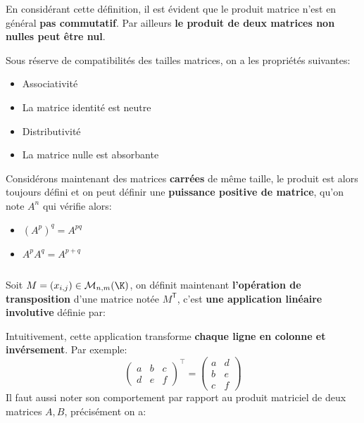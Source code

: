 En considérant cette définition, il est évident que le produit matrice n'est en général \textbf{pas commutatif}. Par ailleurs \textbf{le produit de deux matrices non nulles peut être nul}.
\pagebreak

Sous réserve de compatibilités des tailles matrices, on a les propriétés suivantes:
\begin{multicols}{2}
   \begin{itemize}
      \item Associativité
      \item La matrice identité est neutre
      \item Distributivité
      \item La matrice nulle est absorbante
   \end{itemize}
\end{multicols}   

Considérons maintenant des matrices \textbf{carrées} de même taille, le produit est alors toujours défini et on peut définir une \textbf{puissance positive de matrice}, qu'on note \(A^n\) qui vérifie alors:

\begin{multicols}{2}
   \begin{itemize}
      \item \((A^p)^q = A^{pq}\)
      \item \(A^pA^q = A^{p +q}\)
   \end{itemize}
\end{multicols}    

\subsection*{}

Soit \(M = (x_{i,j})\in \mathcal{M}_{n, m}(\K)\), on définit maintenant \textbf{l'opération de transposition} d'une matrice notée \(M^\mathsf{T}\), c'est \textbf{une application linéaire involutive} définie par:

Intuitivement, cette application transforme \textbf{chaque ligne en colonne et invérsement}. Par exemple:
\[
   \begin{pmatrix}
      a & b & c\\
      d & e & f
   \end{pmatrix}^\top = 
   \begin{pmatrix}
      a & d\\
      b & e\\
      c & f
   \end{pmatrix}
\]
Il faut aussi noter son comportement par rapport au produit matriciel de deux matrices \(A, B\), précisément on a:


